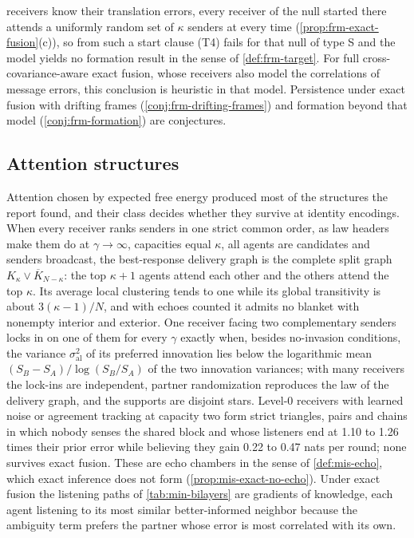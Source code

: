 receivers know their translation errors, every receiver of the null started there attends a uniformly random set of $\kappa$ senders at every time (\cref{prop:frm-exact-fusion}(c)), so from such a start clause (T4) fails for that null of type S and the model yields no formation result in the sense of \cref{def:frm-target}. For full cross-covariance-aware exact fusion, whose receivers also model the correlations of message errors, this conclusion is heuristic in that model. Persistence under exact fusion with drifting frames (\cref{conj:frm-drifting-frames}) and formation beyond that model (\cref{conj:frm-formation}) are conjectures.

\subsection{Attention structures}\label{sec:min-attention}

Attention chosen by expected free energy produced most of the structures the report found, and their class decides whether they survive at identity encodings. When every receiver ranks senders in one strict common order, as law headers make them do at $\gamma\to\infty$, capacities equal $\kappa$, all agents are candidates and senders broadcast, the best-response delivery graph is the complete split graph $K_\kappa\vee\overline K_{N-\kappa}$: the top $\kappa+1$ agents attend each other and the others attend the top $\kappa$. Its average local clustering tends to one while its global transitivity is about $3(\kappa-1)/N$, and with echoes counted it admits no blanket with nonempty interior and exterior. One receiver facing two complementary senders locks in on one of them for every $\gamma$ exactly when, besides no-invasion conditions, the variance $\sigma^2_{\mathrm{al}}$ of its preferred innovation lies below the logarithmic mean $(S_B-S_A)/\log(S_B/S_A)$ of the two innovation variances; with many receivers the lock-ins are independent, partner randomization reproduces the law of the delivery graph, and the supports are disjoint stars. Level-0 receivers with learned noise or agreement tracking at capacity two form strict triangles, pairs and chains in which nobody senses the shared block and whose listeners end at 1.10 to 1.26 times their prior error while believing they gain 0.22 to 0.47 nats per round; none survives exact fusion. These are echo chambers in the sense of \cref{def:mis-echo}, which exact inference does not form (\cref{prop:mis-exact-no-echo}). Under exact fusion the listening paths of \cref{tab:min-bilayers} are gradients of knowledge, each agent listening to its most similar better-informed neighbor because the ambiguity term prefers the partner whose error is most correlated with its own.

